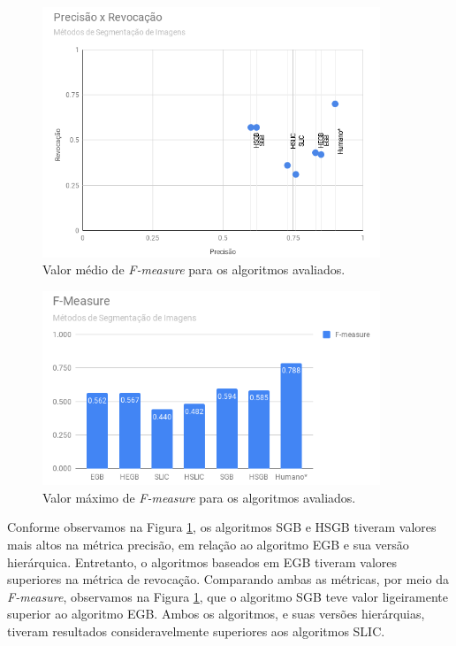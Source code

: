 \begin{document}
\begin{figure}[ht]
\centering
\includegraphics[width=0.9\textwidth]{graph_precision_recall.png}
\caption{Valor médio de \textit{F-measure} para os algoritmos avaliados.}
\label{gra:PREC_RECALL}
\end{figure}

\begin{figure}[ht]
\centering
\includegraphics[width=0.90\textwidth]{graph_fmeasure.png}
\caption{Valor máximo de \textit{F-measure} para os algoritmos avaliados.}
\label{gra:FMEASURE}
\end{figure}

Conforme observamos na Figura \ref{gra:PREC_RECALL}, os algoritmos SGB e HSGB tiveram valores mais altos na métrica precisão, em relação ao algoritmo EGB e sua versão hierárquica. Entretanto, o algoritmos baseados em EGB tiveram valores superiores na métrica de revocação. Comparando ambas as métricas, por meio da \textit{F-measure}, observamos na Figura \ref{gra:PREC_RECALL}, que o algoritmo SGB teve valor ligeiramente superior ao algoritmo EGB. Ambos os algoritmos, e suas versões hierárquias, tiveram resultados consideravelmente superiores aos algoritmos SLIC.
\end{document}
